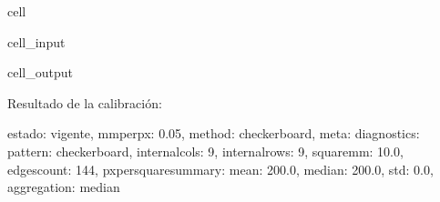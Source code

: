 \documentclass[a4paper,10pt,spanish]{jupyterBook}
\begin{document}
\begin{sphinxuseclass}{cell}\begin{sphinxVerbatimInput}

\begin{sphinxuseclass}{cell_input}
\begin{sphinxVerbatim}[commandchars=\\\{\}]
  
\end{sphinxVerbatim}

\end{sphinxuseclass}\end{sphinxVerbatimInput}
\begin{sphinxVerbatimOutput}

\begin{sphinxuseclass}{cell_output}
\begin{sphinxVerbatim}[commandchars=\\\{\}]
Resultado de la calibración:
\end{sphinxVerbatim}

\begin{sphinxVerbatim}[commandchars=\\\{\}]
\PYGZob{}\PYGZsq{}estado\PYGZsq{}: \PYGZsq{}vigente\PYGZsq{},
 \PYGZsq{}mm\PYGZus{}per\PYGZus{}px\PYGZsq{}: 0.05,
 \PYGZsq{}method\PYGZsq{}: \PYGZsq{}checkerboard\PYGZsq{},
 \PYGZsq{}meta\PYGZsq{}: \PYGZob{}\PYGZsq{}diagnostics\PYGZsq{}: \PYGZob{}\PYGZsq{}pattern\PYGZsq{}: \PYGZsq{}checkerboard\PYGZsq{},
   \PYGZsq{}internal\PYGZus{}cols\PYGZsq{}: 9,
   \PYGZsq{}internal\PYGZus{}rows\PYGZsq{}: 9,
   \PYGZsq{}square\PYGZus{}mm\PYGZsq{}: 10.0,
   \PYGZsq{}edges\PYGZus{}count\PYGZsq{}: 144,
   \PYGZsq{}px\PYGZus{}per\PYGZus{}square\PYGZus{}summary\PYGZsq{}: \PYGZob{}\PYGZsq{}mean\PYGZsq{}: 200.0, \PYGZsq{}median\PYGZsq{}: 200.0, \PYGZsq{}std\PYGZsq{}: 0.0\PYGZcb{},
   \PYGZsq{}aggregation\PYGZsq{}: \PYGZsq{}median\PYGZsq{}\PYGZcb{}\PYGZcb{}\PYGZcb{}
\end{sphinxVerbatim}

\end{sphinxuseclass}\end{sphinxVerbatimOutput}

\end{sphinxuseclass}
\end{document}
